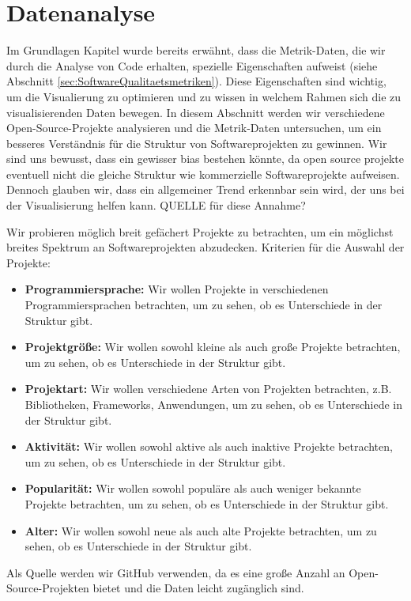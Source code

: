 \section{Datenanalyse} \label{sec:datenAnalyse}

Im Grundlagen Kapitel wurde bereits erwähnt, dass die Metrik-Daten, die wir durch die Analyse von Code erhalten, spezielle Eigenschaften aufweist (siehe Abschnitt \ref{sec:SoftwareQualitaetsmetriken}). Diese Eigenschaften sind wichtig, um die Visualierung zu optimieren und zu wissen in welchem Rahmen sich die zu visualisierenden Daten bewegen. 
In diesem Abschnitt werden wir verschiedene Open-Source-Projekte analysieren und die Metrik-Daten untersuchen, um ein besseres Verständnis für die Struktur von Softwareprojekten zu gewinnen. 
Wir sind uns bewusst, dass ein gewisser bias bestehen könnte, da open source projekte eventuell nicht die gleiche Struktur wie kommerzielle Softwareprojekte aufweisen. Dennoch glauben wir, dass ein allgemeiner Trend erkennbar sein wird, der uns bei der Visualisierung helfen kann. QUELLE für diese Annahme?

Wir probieren möglich breit gefächert Projekte zu betrachten, um ein möglichst breites Spektrum an Softwareprojekten abzudecken. 
Kriterien für die Auswahl der Projekte:
\begin{itemize}
    \item \textbf{Programmiersprache:} Wir wollen Projekte in verschiedenen Programmiersprachen betrachten, um zu sehen, ob es Unterschiede in der Struktur gibt.
    \item \textbf{Projektgröße:} Wir wollen sowohl kleine als auch große Projekte betrachten, um zu sehen, ob es Unterschiede in der Struktur gibt.
    \item \textbf{Projektart:} Wir wollen verschiedene Arten von Projekten betrachten, z.B. Bibliotheken, Frameworks, Anwendungen, um zu sehen, ob es Unterschiede in der Struktur gibt.
    \item \textbf{Aktivität:} Wir wollen sowohl aktive als auch inaktive Projekte betrachten, um zu sehen, ob es Unterschiede in der Struktur gibt.
    \item \textbf{Popularität:} Wir wollen sowohl populäre als auch weniger bekannte Projekte betrachten, um zu sehen, ob es Unterschiede in der Struktur gibt.
    \item \textbf{Alter:} Wir wollen sowohl neue als auch alte Projekte betrachten, um zu sehen, ob es Unterschiede in der Struktur gibt.
\end{itemize}
Als Quelle werden wir GitHub verwenden, da es eine große Anzahl an Open-Source-Projekten bietet und die Daten leicht zugänglich sind.
